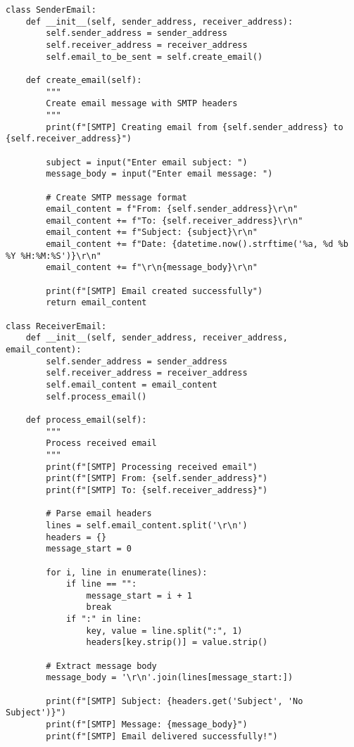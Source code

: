 \documentclass[12pt,a4paper]{article}
\begin{document}
\begin{lstlisting}[caption=SMTP Email Service]
class SenderEmail:
    def __init__(self, sender_address, receiver_address):
        self.sender_address = sender_address
        self.receiver_address = receiver_address
        self.email_to_be_sent = self.create_email()
    
    def create_email(self):
        """
        Create email message with SMTP headers
        """
        print(f"[SMTP] Creating email from {self.sender_address} to {self.receiver_address}")
        
        subject = input("Enter email subject: ")
        message_body = input("Enter email message: ")
        
        # Create SMTP message format
        email_content = f"From: {self.sender_address}\r\n"
        email_content += f"To: {self.receiver_address}\r\n"
        email_content += f"Subject: {subject}\r\n"
        email_content += f"Date: {datetime.now().strftime('%a, %d %b %Y %H:%M:%S')}\r\n"
        email_content += f"\r\n{message_body}\r\n"
        
        print(f"[SMTP] Email created successfully")
        return email_content

class ReceiverEmail:
    def __init__(self, sender_address, receiver_address, email_content):
        self.sender_address = sender_address
        self.receiver_address = receiver_address
        self.email_content = email_content
        self.process_email()
    
    def process_email(self):
        """
        Process received email
        """
        print(f"[SMTP] Processing received email")
        print(f"[SMTP] From: {self.sender_address}")
        print(f"[SMTP] To: {self.receiver_address}")
        
        # Parse email headers
        lines = self.email_content.split('\r\n')
        headers = {}
        message_start = 0
        
        for i, line in enumerate(lines):
            if line == "":
                message_start = i + 1
                break
            if ":" in line:
                key, value = line.split(":", 1)
                headers[key.strip()] = value.strip()
        
        # Extract message body
        message_body = '\r\n'.join(lines[message_start:])
        
        print(f"[SMTP] Subject: {headers.get('Subject', 'No Subject')}")
        print(f"[SMTP] Message: {message_body}")
        print(f"[SMTP] Email delivered successfully!")
\end{lstlisting}
\end{document}
